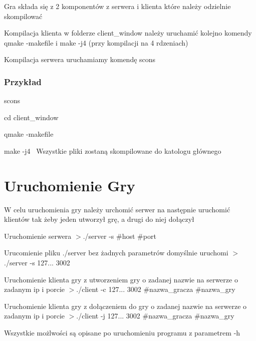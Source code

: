 Gra składa się z 2 komponentów z serwera i klienta które należy odzielnie skompilować


\begin{DoxyItemize}
\item Kompilacja klienta w folderze client\+\_\+window należy uruchamić kolejno komendy qmake -\/makefile i make -\/j4 (przy kompilacji na 4 rdzeniach)
\item Kompilacja serwera uruchamiamy komendę scons
\end{DoxyItemize}

\subsubsection*{Przykład}


\begin{DoxyItemize}
\item scons
\item cd client\+\_\+window
\item qmake -\/makefile
\item make -\/j4~\newline
 Wszystkie pliki zostaną skompilowane do katologu głównego
\end{DoxyItemize}

\section*{Uruchomienie Gry}

W celu uruchomienia gry należy urchomić serwer na następnie uruchomić klientów tak żeby jeden utworzył grę, a drugi do niej dołączył


\begin{DoxyItemize}
\item Uruchomienie serwera $>$./server -\/s \#host \#port
\item Urucomienie pliku ./server bez żadnych parametrów domyślnie uruchomi $>$./server -\/s 127... 3002
\item Uruchomienie klienta gry z utworzeniem gry o zadanej nazwie na serwerze o zadanym ip i porcie $>$./client -\/c 127... 3002 \#nazwa\+\_\+gracza \#nazwa\+\_\+gry
\item Uruchomienie klienta gry z dołączeniem do gry o zadanej nazwie na serwerze o zadanym ip i porcie $>$./client -\/j 127... 3002 \#nazwa\+\_\+gracza \#nazwa\+\_\+gry
\item Wszystkie możlwości są opisane po uruchomieniu programu z parametrem -\/h
\end{DoxyItemize}


